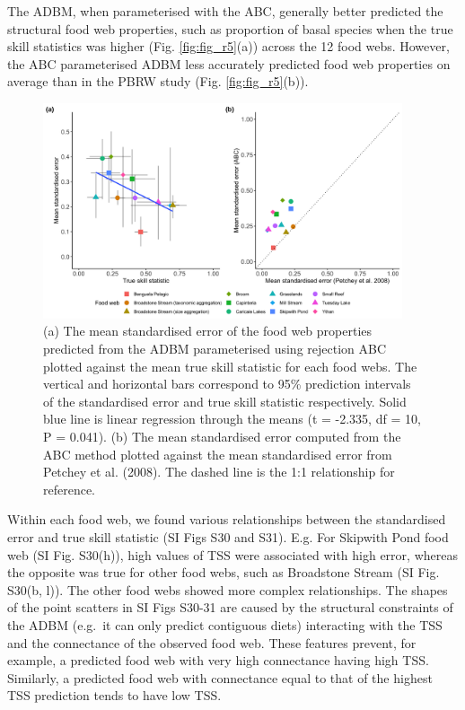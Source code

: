 \documentclass{article}
\begin{document}
The ADBM, when parameterised with the ABC, generally better predicted
the structural food web properties, such as proportion of basal species
when the true skill statistics was higher (Fig. \ref{fig:fig_r5}(a))
across the 12 food webs. However, the ABC parameterised ADBM less
accurately predicted food web properties on average than in the PBRW
study (Fig. \ref{fig:fig_r5}(b)).

\begin{figure}

{\centering \includegraphics[width=400px]{fig/fig7} 

}

\caption{\label{fig:fig_r5} (a) The mean standardised error of the food web properties predicted from the ADBM parameterised using rejection ABC plotted against the mean true skill statistic for each food webs. The vertical and horizontal bars correspond to 95\% prediction intervals of the standardised error and true skill statistic respectively. Solid blue line is linear regression through the means (t = -2.335, df = 10, P = 0.041). (b) The mean standardised error computed from the ABC method plotted against the mean standardised error from Petchey et al. (2008). The dashed line is the 1:1 relationship for reference.}\label{fig:unnamed-chunk-9}
\end{figure}

Within each food web, we found various relationships between the
standardised error and true skill statistic (SI Figs S30 and S31). E.g.
For Skipwith Pond food web (SI Fig. S30(h)), high values of TSS were
associated with high error, whereas the opposite was true for other food
webs, such as Broadstone Stream (SI Fig. S30(b, l)). The other food webs
showed more complex relationships. The shapes of the point scatters in
SI Figs S30-31 are caused by the structural constraints of the ADBM
(e.g.~it can only predict contiguous diets) interacting with the TSS and
the connectance of the observed food web. These features prevent, for
example, a predicted food web with very high connectance having high
TSS. Similarly, a predicted food web with connectance equal to that of
the highest TSS prediction tends to have low TSS.
\end{document}
